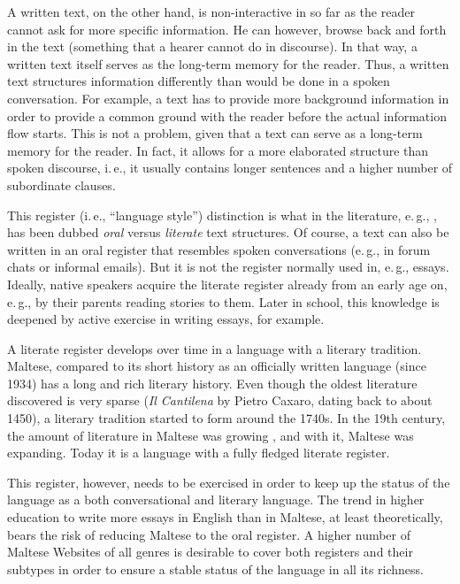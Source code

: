 \begin{multicols}{2}
A written text, on the other hand, is non-interactive in so far as the reader cannot ask for more specific information. He can however, browse back and forth in the text (something that a hearer cannot do in discourse). In that way, a written text itself serves as the long-term memory for the reader. Thus, a written text structures information differently than would be done in a spoken conversation. For example, a text has to provide more background information in order to provide a common ground with the reader before the actual information flow starts. This is not a problem, given that a text can serve as a long-term memory for the reader. In fact, it allows for a more elaborated structure than spoken discourse, i.\,e., it usually contains longer sentences and a higher number of subordinate clauses. 

This register (i.\,e., ``language style'') distinction is what in the literature, e.\,g., \cite{Biber:1991}, has been dubbed \emph{oral} versus \emph{literate} text structures. Of course, a text can also be written in an oral register that resembles spoken conversations (e.\,g., in forum chats or informal emails). But it is not the register normally used in, e.\,g., essays. Ideally, native speakers acquire the literate register already from an early age on, e.\,g., by their parents reading stories to them. Later in school, this knowledge is deepened by active exercise in writing essays, for example.

A literate register develops over time in a language with a literary tradition. Maltese, compared to its short history as an officially written language (since 1934) has a long and rich literary history. Even though the oldest literature discovered is very sparse (\emph{Il Cantilena} by Pietro Caxaro, dating back to about 1450), a literary tradition started to form around the 1740s. In the 19th century, the amount of literature in Maltese was growing \cite{Fabri:2011a}, and with it, Maltese was expanding. Today it is a language with a fully fledged literate register. 

This register, however, needs to be exercised in order to keep up the status of the language as a both conversational and literary language. The trend in higher education to write more essays in English than in Maltese, at least theoretically, bears the risk of reducing Maltese to the oral register. A higher number of Maltese Websites of all genres is desirable to cover both registers and their subtypes in order to ensure a stable status of the language in all its richness.


\end{multicols}
